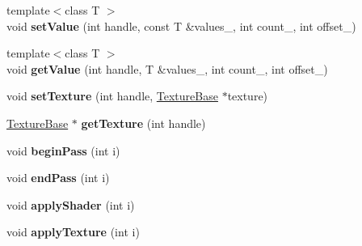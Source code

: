 \begin{DoxyCompactItemize}
\item 
{\footnotesize template$<$class T $>$ }\\void {\bfseries set\+Value} (int handle, const T \&values\+\_\+, int count\+\_, int offset\+\_)\hypertarget{class_magnum_1_1_visual_effect_ad4d03ae34fea8f6d34fea817c57c280b}{}\label{class_magnum_1_1_visual_effect_ad4d03ae34fea8f6d34fea817c57c280b}

\item 
{\footnotesize template$<$class T $>$ }\\void {\bfseries get\+Value} (int handle, T \&values\+\_\+, int count\+\_, int offset\+\_)\hypertarget{class_magnum_1_1_visual_effect_a5b4ada9235ff1bfb43a572e1ecd096e0}{}\label{class_magnum_1_1_visual_effect_a5b4ada9235ff1bfb43a572e1ecd096e0}

\item 
void {\bfseries set\+Texture} (int handle, \hyperlink{class_magnum_1_1_texture_base}{Texture\+Base} $\ast$texture)\hypertarget{class_magnum_1_1_visual_effect_abbdecc24dc3c84049e637a9deb8bcf40}{}\label{class_magnum_1_1_visual_effect_abbdecc24dc3c84049e637a9deb8bcf40}

\item 
\hyperlink{class_magnum_1_1_texture_base}{Texture\+Base} $\ast$ {\bfseries get\+Texture} (int handle)\hypertarget{class_magnum_1_1_visual_effect_adec9955a42b03c51cc4c4c6001548d84}{}\label{class_magnum_1_1_visual_effect_adec9955a42b03c51cc4c4c6001548d84}

\item 
void {\bfseries begin\+Pass} (int i)\hypertarget{class_magnum_1_1_visual_effect_af84cafa2f98076d1cf21fc95db74d83e}{}\label{class_magnum_1_1_visual_effect_af84cafa2f98076d1cf21fc95db74d83e}

\item 
void {\bfseries end\+Pass} (int i)\hypertarget{class_magnum_1_1_visual_effect_ac13ed856d843c21114efc019eb34004f}{}\label{class_magnum_1_1_visual_effect_ac13ed856d843c21114efc019eb34004f}

\item 
void {\bfseries apply\+Shader} (int i)\hypertarget{class_magnum_1_1_visual_effect_a0a54bcd53c4f312ceb6ee9c847acd5c8}{}\label{class_magnum_1_1_visual_effect_a0a54bcd53c4f312ceb6ee9c847acd5c8}

\item 
void {\bfseries apply\+Texture} (int i)\hypertarget{class_magnum_1_1_visual_effect_a80ea4314d2da6aee5b70d2bc3e724b03}{}\label{class_magnum_1_1_visual_effect_a80ea4314d2da6aee5b70d2bc3e724b03}


\end{DoxyCompactItemize}
